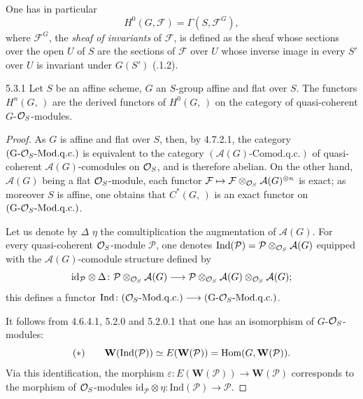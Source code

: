 One has in particular
\[
H^{0}(G,\mathcal{F})=\Gamma(S,\mathcal{F}^{G}),
\]
where \(\mathcal{F}^{G}\), the \emph{sheaf of invariants} of \(\mathcal{F}\),
is defined as the sheaf whose sections over the open \(U\) of \(S\) are the
sections of \(\mathcal{F}\) over \(U\) whose inverse image in every \(S'\)
over \(U\) is invariant under \(G(S')\) (.1.2).

\begin{theorem}{5.3.1}
\label{I.5.3.1}
Let \(S\) be an affine scheme, \(G\) an \(S\)-group affine and flat over \(S\).
The functors \(H^{n}(G,\,)\) are the derived functors of \(H^{0}(G,\,)\) on the
category of quasi-coherent \(G\)-\(\mathcal{O}_S\)-modules.
\end{theorem}

\begin{proof}
As \(G\) is affine and flat over \(S\), then, by 4.7.2.1, the category
\((\mathrm{G}\text{-}\mathcal{O}_S\text{-}\mathrm{Mod.q.c.})\) is equivalent to the
category \((\mathcal{A}(G)\text{-}\mathrm{Comod.q.c.})\) of quasi-coherent
\(\mathcal{A}(G)\)-comodules on \(\mathcal{O}_S\), and is therefore abelian. On the
other hand, \(\mathcal{A}(G)\) being a flat \(\mathcal{O}_S\)-module, each functor
\(\mathcal{F}\mapsto\mathcal{F}\otimes_{\mathcal{O}_S}\mathcal{A}(G)^{\otimes n}\) is
exact; as moreover \(S\) is affine, one obtains that \(C^{*}(G,\,)\) is an
exact functor on \((\mathrm{G}\text{-}\mathcal{O}_S\text{-}\mathrm{Mod.q.c.})\).

Let us denote by \(\Delta\) \resp \(\eta\) the comultiplication \resp the
augmentation of \(\mathcal{A}(G)\). For every quasi-coherent \(\mathcal{O}_S\)-module
\(\mathcal{P}\), one denotes
\(\mathrm{Ind}(\mathcal{P})=\mathcal{P}\otimes_{\mathcal{O}_S}\mathcal{A}(G)\) equipped
with the \(\mathcal{A}(G)\)-comodule structure defined by
\[
\mathrm{id}_{\mathcal{P}}\otimes\Delta\colon
\mathcal{P}\otimes_{\mathcal{O}_S}\mathcal{A}(G)
\longrightarrow
\mathcal{P}\otimes_{\mathcal{O}_S}\mathcal{A}(G)\otimes_{\mathcal{O}_S}\mathcal{A}(G);
\]
this defines a functor
\(\mathrm{Ind}\colon(\mathcal{O}_S\text{-}\mathrm{Mod.q.c.})\longrightarrow(\mathrm{G}\text{-}\mathcal{O}_S\text{-}\mathrm{Mod.q.c.})\).

It follows from 4.6.4.1, 5.2.0 and 5.2.0.1 that one has an isomorphism of
\(G\)-\(\mathcal{O}_S\)-modules:
\[
(*)\qquad
\mathbf{W}(\mathrm{Ind}(\mathcal{P}))
\simeq
E(\mathbf{W}(\mathcal{P}))
=\operatorname{Hom}(G,\mathbf{W}(\mathcal{P})).
\]
Via this identification, the morphism
\(\varepsilon\colon E(\mathbf{W}(\mathcal{P}))\to\mathbf{W}(\mathcal{P})\)
corresponds to the morphism of \(\mathcal{O}_S\)-modules
\(\mathrm{id}_{\mathcal{P}}\otimes\eta\colon\mathrm{Ind}(\mathcal{P})\to\mathcal{P}\).


\end{proof}
